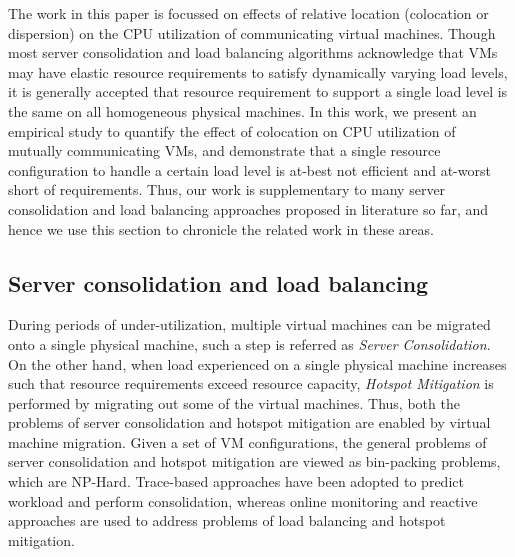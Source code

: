 
The work in this paper is focussed on effects of relative location
(colocation or dispersion) on the CPU utilization of communicating virtual
machines. 
Though most server consolidation and load balancing algorithms 
\cite{capacity-management, sandpiper, autonomic-vm-placement} acknowledge
that VMs may have elastic resource requirements to satisfy dynamically
varying load levels, it is generally accepted that resource requirement
to support a single load level is the same on all homogeneous physical 
machines. In this work, we present an empirical study to quantify the effect 
of colocation on CPU utilization of mutually communicating VMs, and 
demonstrate that a single resource configuration to handle a certain 
load level is at-best not efficient and at-worst short of requirements.
Thus, our work is supplementary to many server consolidation and load 
balancing approaches proposed in literature so far, and hence we use 
this section to chronicle the related work in these areas.

\subsection{Server consolidation and load balancing} 
During periods of under-utilization, multiple virtual machines can
be migrated onto a single physical machine, such a step is referred
as \textit{Server Consolidation}. On the other hand, when load
experienced on a single physical machine increases such that resource
requirements exceed resource capacity, \textit{Hotspot Mitigation} is
performed by migrating out some of the virtual machines.
Thus, both the problems of server consolidation and hotspot mitigation are
enabled by virtual machine migration.
Given a set of VM configurations, the general problems of server consolidation
and hotspot mitigation are viewed as bin-packing problems, which are NP-Hard. 
Trace-based approaches \cite{capacity-management} have been adopted to 
predict workload and perform consolidation, whereas online monitoring
and reactive approaches \cite{sandpiper, autonomic-vm-placement} are used
to address problems of load balancing and hotspot mitigation. 

